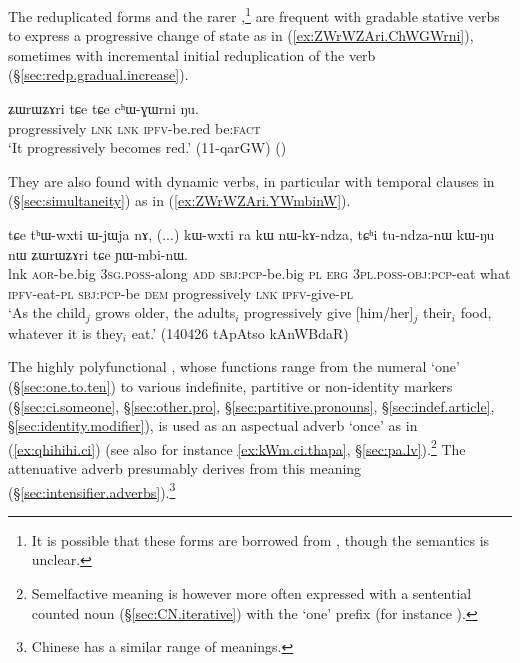 The reduplicated forms  and the rarer ,\footnote{It is possible that these forms are borrowed from , though the semantics is unclear. } are frequent with gradable stative verbs to express a progressive change of state as in (\ref{ex:ZWrWZAri.ChWGWrni}), sometimes with incremental initial reduplication of the verb (§\ref{sec:redp.gradual.increase}).


\begin{exe}
\ex \label{ex:ZWrWZAri.ChWGWrni}
\gll ʑɯrɯʑɤri tɕe tɕe cʰɯ-ɣɯrni ŋu. \\
progressively \textsc{lnk} \textsc{lnk} \textsc{ipfv}-be.red be:\textsc{fact} \\
\glt `It progressively becomes red.' (11-qarGW)
()
\end{exe}

They are also found with dynamic verbs, in particular with temporal clauses in  (§\ref{sec:simultaneity}) as in (\ref{ex:ZWrWZAri.YWmbinW}).

\begin{exe}
\ex \label{ex:ZWrWZAri.YWmbinW}
\gll  tɕe tʰɯ-wxti ɯ-jɯja nɤ, (...) kɯ-wxti ra kɯ nɯ-kɤ-ndza, tɕʰi tu-ndza-nɯ kɯ-ŋu nɯ ʑɯrɯʑɤri tɕe ɲɯ-mbi-nɯ. \\
lnk  \textsc{aor}-be.big  \textsc{3sg}.\textsc{poss}-along \textsc{add} {  } \textsc{sbj}:\textsc{pcp}-be.big \textsc{pl} \textsc{erg} \textsc{3pl}.\textsc{poss}-\textsc{obj}:\textsc{pcp}-eat what \textsc{ipfv}-eat-\textsc{pl} \textsc{sbj}:\textsc{pcp}-be \textsc{dem} progressively \textsc{lnk} \textsc{ipfv}-give-\textsc{pl} \\
\glt  `As the child$_j$ grows older, the adults$_i$ progressively give [him/her]$_j$ their$_i$ food, whatever it is they$_i$ eat.' (140426 tApAtso kAnWBdaR)
\end{exe}
 

The highly polyfunctional , whose functions range from the numeral `one' (§\ref{sec:one.to.ten}) to various indefinite, partitive or non-identity markers (§\ref{sec:ci.someone}, §\ref{sec:other.pro}, §\ref{sec:partitive.pronouns}, §\ref{sec:indef.article}, §\ref{sec:identity.modifier}), is used as an aspectual adverb `once' as in (\ref{ex:qhihihi.ci}) (see also for instance \ref{ex:kWm.ci.thapa}, §\ref{sec:pa.lv}).\footnote{Semelfactive meaning is however more often expressed with a sentential counted noun (§\ref{sec:CN.iterative}) with the `one' prefix (for instance ). } The attenuative adverb  presumably derives from this meaning (§\ref{sec:intensifier.adverbs}).\footnote{Chinese  has a similar range of meanings. }

